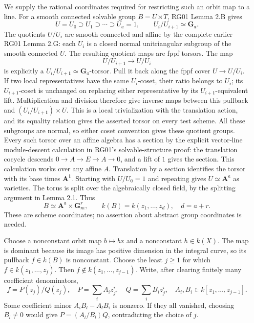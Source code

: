 \documentclass[11pt,a4paper,openany]{report}
\begin{document}
We supply the rational coordinates required for restricting such an orbit map to a line. For a smooth connected solvable group \(B=U\rtimes T\), RG01 Lemma 2.B gives \[
 U=U_0\supset U_1\supset\cdots\supset U_a=1,
 \qquad U_i/U_{i+1}\simeq\mathbf G_a.
\] The quotients \(U/U_i\) are smooth connected and affine by the complete earlier RG01 Lemma 2.G: each \(U_i\) is a closed normal unitriangular subgroup of the smooth connected \(U\). The resulting quotient maps are fppf torsors. The map \[
 U/U_{i+1}\longrightarrow U/U_i
\] is explicitly a \(U_i/U_{i+1}\simeq\mathbf G_a\)-torsor. Pull it back along the fppf cover \(U\to U/U_i\). If two local representatives have the same \(U_i\)-coset, their ratio belongs to \(U_i\); its \(U_{i+1}\)-coset is unchanged on replacing either representative by its \(U_{i+1}\)-equivalent lift. Multiplication and division therefore give inverse maps between this pullback and \((U_i/U_{i+1})\times U\). This is a local trivialization with the translation action, and its equality relation gives the asserted torsor on every test scheme. All these subgroups are normal, so either coset convention gives these quotient groups. Every such torsor over an affine algebra has a section by the explicit vector-line module-descent calculation in RG01's solvable-structure proof: the translation cocycle descends \(0\to A\to E\to A\to0\), and a lift of \(1\) gives the section. This calculation works over any affine \(A\). Translation by a section identifies the torsor with its base times \(\mathbf A^1\). Starting with \(U/U_0=1\) and repeating gives \(U\simeq\mathbf A^a\) as varieties. The torus is split over the algebraically closed field, by the splitting argument in Lemma 2.1. Thus \[
 B\simeq\mathbf A^a\times\mathbf G_m^r,
 \qquad k(B)=k(z_1,\ldots,z_d),\quad d=a+r.
\] These are scheme coordinates; no assertion about abstract group coordinates is needed.

Choose a nonconstant orbit map \(b\mapsto bx\) and a nonconstant \(h\in k(X)\). The map is dominant because its image has positive dimension in the integral curve, so its pullback \(f\in k(B)\) is nonconstant. Choose the least \(j\ge1\) for which \(f\in k(z_1,\ldots,z_j)\). Then \(f\notin k(z_1,\ldots,z_{j-1})\). Write, after clearing finitely many coefficient denominators, \[
 f=P(z_j)/Q(z_j),\quad
 P=\sum_i A_i z_j^i,\quad Q=\sum_i B_i z_j^i,
 \quad A_i,B_i\in k[z_1,\ldots,z_{j-1}].
\] Some coefficient minor \(A_iB_l-A_lB_i\) is nonzero. If they all vanished, choosing \(B_l\ne0\) would give \(P=(A_l/B_l)Q\), contradicting the choice of \(j\).
\end{document}

